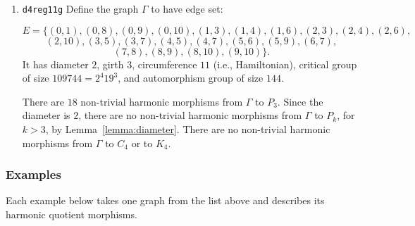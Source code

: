 \documentclass[12pt,letterpaper]{article}
\theoremstyle{definition}
\begin{document}
\begin{enumerate}
\item
 {\tt d4reg11g}\newline
  Define the graph  $\Gamma$
  to have edge set:

\[
E = \{
(0, 1), (0, 8), (0, 9), (0, 10), (1, 3), (1, 4), (1, 6), (2, 3), (2, 4), (2, 6),
\]
\[
 (2, 10), (3, 5), (3, 7), (4, 5), (4, 7), (5, 6), (5, 9), (6, 7),
\]
\[
(7, 8), (8, 9), (8, 10), (9, 10)
\}.
\]
It has diameter $2$,
girth $3$, circumference $11$ (i.e., Hamiltonian),
critical group of size $109744=2^{4} 19^3$, 
and automorphism group of size $144$.

There are $18$ non-trivial harmonic morphisms from $\Gamma$ to $P_3$.
Since the diameter is $2$, there are no non-trivial harmonic morphisms
from $\Gamma$ to $P_k$, for $k>3$, by Lemma~\ref{lemma:diameter}.
There are no non-trivial harmonic morphisms
from $\Gamma$ to $C_4$ or to $K_4$.

\end{enumerate}



\subsubsection{Examples}

Each example below takes one graph from the list above and describes
its harmonic quotient morphisms.
\end{document}
